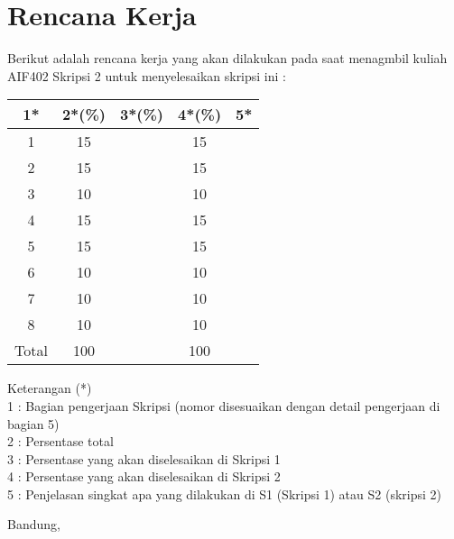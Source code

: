 \documentclass[a4paper,twoside]{article}
\begin{document}
\section{Rencana Kerja}

Berikut adalah rencana kerja yang akan dilakukan pada saat menagmbil kuliah AIF402 Skripsi 2 untuk menyelesaikan skripsi ini :

\begin{center}
  \begin{tabular}{ | c | c | c | c | l |}
    \hline
    1*  & 2*(\%) & 3*(\%) & 4*(\%) &5*\\ \hline \hline
    1   & 15  &    & 15  & \\ \hline
    2   & 15  &    & 15  & \\ \hline
    3   & 10  &    & 10  & \\ \hline
    4   & 15  &    &  15 & \\ \hline
    5   & 15  &    &  15 & \\ \hline
    6   & 10  &    &  10 & \\ \hline
    7   & 10 &    & 10 & \\ \hline
    8  & 10 &    & 10 & \\ \hline
    Total  & 100  &    & 100 &  \\ \hline
                          \end{tabular}
\end{center}

Keterangan (*)\\
1 : Bagian pengerjaan Skripsi (nomor disesuaikan dengan detail pengerjaan di bagian 5)\\
2 : Persentase total \\
3 : Persentase yang akan diselesaikan di Skripsi 1 \\
4 : Persentase yang akan diselesaikan di Skripsi 2 \\
5 : Penjelasan singkat apa yang dilakukan di S1 (Skripsi 1) atau S2 (skripsi 2)

\newpage 
\vspace{1 cm}
\centering Bandung, \tanggal\\
\vspace{2cm} \nama \\ 
\vspace{1cm}
\end{document}

